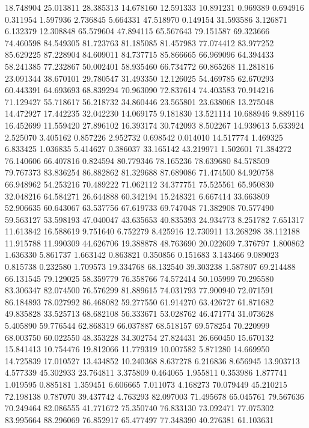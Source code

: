 18.748904
25.013811
28.385313
14.678160
12.591333
10.891231
0.969389
0.694916
0.311954
1.597936
2.736845
5.664331
47.518970
0.149154
31.593586
3.126871
6.132379
12.308848
65.579604
47.894115
65.567643
79.151587
69.323666
74.460598
84.549305
81.723763
81.185085
81.457983
77.074412
83.977252
85.629225
87.228904
84.609011
84.737715
85.866665
66.969096
64.394433
58.241385
77.232867
50.002401
58.935460
66.734772
60.865268
11.281816
23.091344
38.670101
29.780547
31.493350
12.126025
54.469785
62.670293
60.443391
64.693693
68.839294
70.963090
72.837614
74.403583
70.914216
71.129427
55.718617
56.218732
34.860446
23.565801
23.638068
13.275048
14.472927
17.442235
32.042230
14.069175
9.181830
13.521114
10.688946
9.889116
16.452699
11.559420
27.896102
16.393174
30.742093
8.502267
14.939613
5.633924
2.525070
3.405162
0.857226
2.952732
0.698542
0.014010
14.517774
1.469325
6.833425
1.036835
5.414627
0.386037
33.165142
43.219971
1.502601
71.384272
76.140606
66.407816
0.824594
80.779346
78.165236
78.639680
84.578509
79.767373
83.836254
86.882862
81.329688
87.689086
71.474500
84.920758
66.948962
54.253216
70.489222
71.062112
34.377751
75.525561
65.950830
32.048216
64.584271
26.644888
60.342194
15.248321
6.667414
33.663809
52.906635
60.643067
63.537756
67.619733
69.747048
71.382908
70.577490
59.563127
53.598193
47.040047
43.635653
40.835393
24.934773
8.251782
7.651317
11.613842
16.588619
9.751640
6.752279
8.425916
12.730911
13.268298
38.112188
11.915788
11.990309
44.626706
19.388878
48.763690
20.022609
7.376797
1.800862
1.636330
5.861737
1.663142
0.863821
0.350856
0.151683
3.143466
9.089023
0.815738
0.232580
1.709573
19.334768
68.132540
39.303238
1.587807
69.214488
66.131545
79.129025
58.359779
76.358766
74.572414
50.105999
70.295580
83.306347
82.074500
76.576299
81.889615
74.031793
77.900940
72.071591
86.184893
78.027992
86.468082
59.277550
61.914270
63.426727
61.871682
49.835828
33.525713
68.682108
56.333671
53.028762
46.471774
31.073628
5.405890
59.776544
62.868319
66.037887
68.518157
69.578254
70.220999
68.003750
60.022550
48.353228
34.302754
27.824431
26.660450
15.670132
15.841413
10.754476
19.812066
11.779319
10.007582
5.871280
14.669950
14.725839
17.010527
13.434852
10.240368
8.637278
6.216836
8.656945
13.903713
4.577339
45.302933
23.764811
3.375809
0.464065
1.955811
0.353986
1.877741
1.019595
0.885181
1.359451
6.606665
7.011073
4.168273
70.079449
45.210215
72.198138
0.787070
39.437742
4.763293
82.097003
71.495678
65.045761
79.567636
70.249464
82.086555
41.771672
75.350740
76.833130
73.092471
77.075302
83.995664
88.296069
76.852917
65.477497
77.348390
40.276381
61.103631
